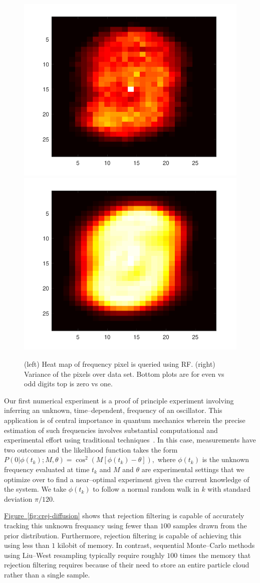 \documentclass{article} %
\newcommand{\fig}[1]{\hyperref[fig:#1]{Figure~\ref*{fig:#1}}}
\begin{document}
\begin{figure}
\begin{minipage}[b]{0.45\linewidth}
\includegraphics[width=0.45\columnwidth]{OEexpHM.pdf}
\includegraphics[width=0.45\columnwidth]{OEHM.pdf}
\caption{(left) Heat map of frequency pixel is queried using RF.  (right) Variance of the pixels over data set.
Bottom plots are for even vs odd digits top is zero vs one.}\label{fig:HM}
\end{minipage}
\end{figure}

Our first numerical experiment is a proof of principle experiment involving inferring an unknown, time--dependent, frequency of an oscillator.
This application is of central importance in quantum mechanics wherein the precise estimation of such frequencies involves substantial
computational and experimental effort using traditional techniques~\cite{wiebe_efficient_2015,ferrie_how_2013}.  In this case, measurements have two outcomes and the likelihood function takes the form
$
P(0|\phi(t_k);M,\theta) = \cos^2(M[\phi(t_k)-\theta]),
$
where $\phi(t_k)$ is the unknown frequency evaluated at time $t_k$ and $M$ and $\theta$ are experimental settings that we optimize over to find a near--optimal
experiment given the current knowledge of the system.  We take $\phi(t_k)$ to follow a normal random walk in $k$ with standard deviation $\pi / 120$.

\fig{crej-diffusion} shows that rejection filtering is capable of accurately tracking this unknown frequancy using fewer than $100$ samples drawn from the prior distribution.  Furthermore, rejection filtering is capable of achieving this using less than $1$ kilobit of memory.  In contrast, sequential Monte--Carlo methods using Liu--West resampling  typically require roughly $100$ times the memory that rejection filtering requires because of their need to store an entire particle cloud rather than a single sample.
\end{document}
